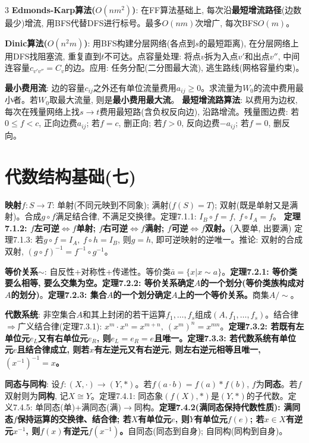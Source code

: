 \documentclass[4.5pt,landscape]{extarticle}
\newcommand{\rd}[1]{\textcolor{rd}{\textbf{#1}}}
\newcommand{\bu}[1]{\textcolor{bu}{\textbf{#1}}}
\newcommand{\xt}[1]{\textbf{#1}}
\begin{document}
\begin{multicols*}{3}
\rd{Edmonds-Karp算法($O(nm^2)$)}: 在FF算法基础上, 每次沿\xt{最短增流路径}(边数最少)增流, 用BFS代替DFS进行标号。最多$O(nm)$次增广, 每次BFS$O(m)$。

\xt{Dinic算法($O(n^2m)$)}: 用BFS构建分层网络(各点到$s$的最短距离), 在分层网络上用DFS找阻塞流, 重复直到$t$不可达。点容量处理: 将点$v$拆为入点$v'$和出点$v''$, 中间连容量$c_{v'v''}=C_v$的边。应用: 任务分配(二分图最大流), 逃生路线(网格容量约束)。

\xt{最小费用流}: 边的容量$c_{ij}$之外还有单位流量费用$a_{ij}\geq0$。求流量为$W_0$的流中费用最小者。若$W_0$取最大流量, 则是\xt{最小费用最大流}。
\xt{最短增流路算法}: 以费用为边权, 每次在残量网络上找$s\to t$费用最短路(含负权反向边), 沿路增流。残量图边费: 若$0\leq f<c$, 正向边费$a_{ij}$; 若$f=c$, 删正向; 若$f>0$, 反向边费$-a_{ij}$; 若$f=0$, 删反向。

\section{代数结构基础(七)}
\xt{映射$f:S\to T$}: 单射(不同元映到不同象); 满射($f(S)=T$); 双射(既是单射又是满射)。合成$g\circ f$满足结合律, 不满足交换律。定理7.1.1: $I_B\circ f=f,\ f\circ I_A=f$。
\bu{定理7.1.2: $f$左可逆$\Leftrightarrow f$单射; $f$右可逆$\Leftrightarrow f$满射; $f$可逆$\Leftrightarrow f$双射。}(入要单, 出要满)
定理7.1.3: 若$g\circ f=I_A,\ f\circ h=I_B$, 则$g=h$, 即可逆映射的逆唯一。推论: 双射的合成双射, $(g\circ f)^{-1}=f^{-1}\circ g^{-1}$。

\xt{等价关系$\sim$}: 自反性+对称性+传递性。等价类$\bar a=\{x|x\sim a\}$。\bu{定理7.2.1: 等价类要么相等, 要么交集为空。}\bu{定理7.2.2: 等价关系确定$A$的一个划分(等价类族构成对$A$的划分)}。\bu{定理7.2.3: 集合$A$的一个划分确定$A$上的一个等价关系。}商集$A/{\sim}$。

\xt{代数系统}: 非空集合$A$和其上封闭的若干运算$f_1,\dots,f_s$组成$(A,f_1,\dots,f_s)$。结合律$\Rightarrow$广义结合律(定理7.3.1): $x^m\cdot x^n=x^{m+n},\ (x^m)^n=x^{mn}$。\bu{定理7.3.2: 若既有左单位元$e_L$又有右单位元$e_R$, 则$e_L=e_R=e$且唯一。}\bu{定理7.3.3: 若代数系统有单位元$e$且结合律成立, 则若$x$有左逆元又有右逆元, 则左右逆元相等且唯一, $(x^{-1})^{-1}=x$。}

\xt{同态与同构}: 设$f:(X,\cdot)\to(Y,*)$。若$f(a\cdot b)=f(a)*f(b)$, $f$为\xt{同态}。若$f$双射则为\xt{同构}, 记$X\cong Y$。定理7.4.1: 同态象$(f(X),*)$是$(Y,*)$的子代数。定义7.4.5: 单同态(单)+满同态(满)$\to$同构。\bu{定理7.4.2(满同态保持代数性质): 满同态$f$保持运算的交换律、结合律; 若$X$有单位元$e$, 则$Y$有单位元$f(e)$; 若$x\in X$有逆元$x^{-1}$, 则$f(x)$有逆元$f(x^{-1})$。}自同态(同态到自身); 自同构(同构到自身)。


\end{multicols*}
\end{document}
